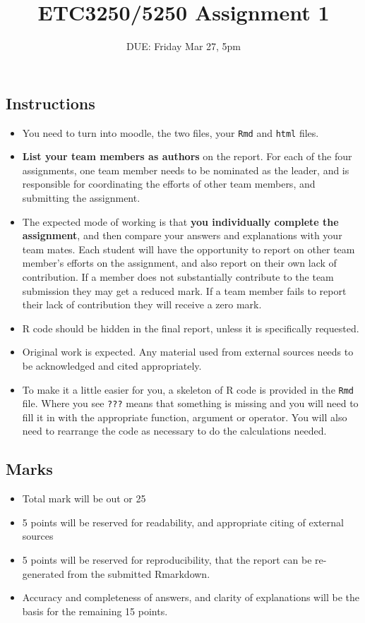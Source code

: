 \documentclass[
]{article}
\title{ETC3250/5250 Assignment 1}
\author{}
\date{\vspace{-2.5em}DUE: Friday Mar 27, 5pm}
\providecommand{\tightlist}{%
  \setlength{\itemsep}{0pt}\setlength{\parskip}{0pt}}
\begin{document}
\maketitle

\hypertarget{instructions}{%
\subsection{Instructions}\label{instructions}}

\begin{itemize}
\tightlist
\item
  You need to turn into moodle, the two files, your \texttt{Rmd} and
  \texttt{html} files.
\item
  \textbf{List your team members as authors} on the report. For each of
  the four assignments, one team member needs to be nominated as the
  leader, and is responsible for coordinating the efforts of other team
  members, and submitting the assignment.
\item
  The expected mode of working is that \textbf{you individually complete
  the assignment}, and then compare your answers and explanations with
  your team mates. Each student will have the opportunity to report on
  other team member's efforts on the assignment, and also report on
  their own lack of contribution. If a member does not substantially
  contribute to the team submission they may get a reduced mark. If a
  team member fails to report their lack of contribution they will
  receive a zero mark.
\item
  R code should be hidden in the final report, unless it is specifically
  requested.
\item
  Original work is expected. Any material used from external sources
  needs to be acknowledged and cited appropriately.
\item
  To make it a little easier for you, a skeleton of R code is provided
  in the \texttt{Rmd} file. Where you see \texttt{???} means that
  something is missing and you will need to fill it in with the
  appropriate function, argument or operator. You will also need to
  rearrange the code as necessary to do the calculations needed.
\end{itemize}

\hypertarget{marks}{%
\subsection{Marks}\label{marks}}

\begin{itemize}
\tightlist
\item
  Total mark will be out or 25
\item
  5 points will be reserved for readability, and appropriate citing of
  external sources
\item
  5 points will be reserved for reproducibility, that the report can be
  re-generated from the submitted Rmarkdown.
\item
  Accuracy and completeness of answers, and clarity of explanations will
  be the basis for the remaining 15 points.
\end{itemize}
\end{document}
